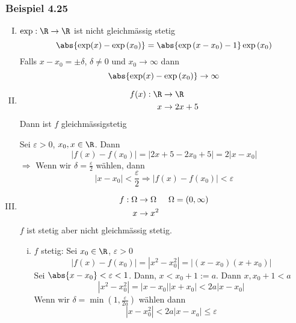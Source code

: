 \subsubsection*{Beispiel 4.25}
\begin{enumerate}[I)]
\item $\exp:\R\to\R$ ist nicht gleichmässig stetig \[\abs{\exp(x)-\exp\left( x_0\right)}=\abs{\exp\left( x-x_0\right)-1}\exp\left( x_0\right)\]
Falls $x-x_0=\pm\delta$, $\delta\not=0$ und $x_0\to\infty$ dann
\[\abs{\exp(x)-\exp\left( x_0\right)}\to\infty\]
\item \begin{align*}
f(x):\R&\to\R\\
x&\to 2x+5
\end{align*}
Dann ist $f$ gleichmässigstetig
\begin{beweis}{}
Sei $\varepsilon>0$, $x_0,x\in\R$. Dann \[\left| {f\left( x \right) - f\left( {{x_0}} \right)} \right| = \left| {2x + 5 - 2{x_0} + 5} \right| = 2\left| {x - {x_0}} \right|\]
$\Rightarrow$ Wenn wir $\delta=\frac{\varepsilon}{2}$ wählen, dann \[\left| {x - {x_0}} \right| < \frac{\varepsilon }{2} \Rightarrow \left| {f\left( x \right) - f\left( {{x_0}} \right)} \right| < \varepsilon \] 
\end{beweis}
\item \begin{align*}
f:\Omega&\to\Omega\hspace{5mm}\Omega=\left( 0,\infty\right)\\
x&\to x^2
\end{align*}
$f$ ist stetig aber nicht gleichmässig stetig. 
\begin{enumerate}[i)]
\item $f$ stetig: Sei $x_0\in\R$, $\varepsilon>0$\[\left| {f\left( x \right) - f\left( {{x_0}} \right)} \right| = \left| {{x^2} - x_0^2} \right| = \left| {\left( {x - {x_0}} \right)\left( {x + {x_0}} \right)} \right|\] Sei $\abs{x-x_0}<\varepsilon<1$. Dann, $x<x_0+1:=a$. Dann $x,x_0+1<a$
\[\left| {{x^2} - x_0^2} \right| = \left| {x - {x_0}} \right|\left| {x + {x_0}} \right| < 2a\left| {x - {x_0}} \right|\]
Wenn wir $\delta=\min\left(1,\frac{\varepsilon}{2a}\right)$ wählen dann \[\left| {x - x_0^2} \right| < 2a\left| {x - {x_a}} \right| \le \varepsilon \]

\end{enumerate}
\end{enumerate}
